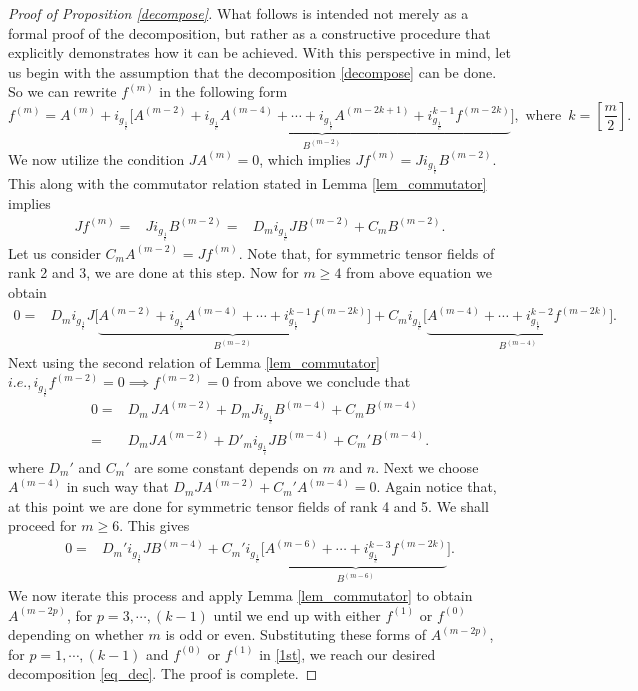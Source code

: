 \documentclass[11pt,a4paper,reqno]{amsart}
\newcommand{\gc}{i_{g_{\frac{1}{c}}}}
\begin{document}
		\begin{proof} [Proof of Proposition \ref{decompose}]
			What follows is intended not merely as a formal proof of the decomposition, but rather as a constructive procedure that explicitly demonstrates how it can be achieved. With this perspective in mind, let us begin with
			the assumption that the decomposition \eqref{decompose} can be done. So we can rewrite $f^{(m)}$ in the following form
			\[ \label{1st}
			f^{(m)}=A^{(m)}+i_{g_{\frac{1}{c}}}\Big[\underbrace{ A^{(m-2)}+i_{g_{\frac{1}{c}}}A^{(m-4)}+\cdots+i_{g_{\frac{1}{c}}}A^{(m-2k+1)}+i_{g_{\frac{1}{c}}}^{k-1}f^{(m-2k)}}_{B^{(m-2)}}\Big], \text{ where }\, k=[\frac{m}{2}].
			\]
			We now utilize the condition $JA^{(m)}=0$, which implies $Jf^{(m)}=Ji_{g_{\frac{1}{c}}}B^{(m-2)}.$ This along with the commutator relation stated in Lemma \ref{lem_commutator} implies
			\[
			\begin{aligned}
				Jf^{(m)}=&Ji_{g_{\frac{1}{c}}}B^{(m-2)}
				=&D_{m}i_{g_{\frac{1}{c}}}JB^{(m-2)}+C_mB^{(m-2)}.
			\end{aligned}
			\]
	Let us consider $C_mA^{(m-2)}=Jf^{(m)}$. Note that, for symmetric tensor fields of rank 2 and 3, we are done at this step. Now for $m\geq 4$  from above equation we obtain 
			\[
			\begin{aligned}
				0=&D_mi_{g_{\frac{1}{c}}}J\Big[\underbrace{ A^{(m-2)}+i_{g_{\frac{1}{c}}}A^{(m-4)}+\cdots+i_{g_{\frac{1}{c}}}^{k-1}f^{(m-2k)}}_{B^{(m-2)}}\Big]+C_{m}i_{g_{\frac{1}{c}}}\Big[\underbrace{ A^{(m-4)}+\cdots+i_{g_{\frac{1}{c}}}^{k-2}f^{(m-2k)}}_{B^{(m-4)}}\Big].
			\end{aligned}
			\]
			Next using  the second relation of Lemma \ref{lem_commutator} $i.e., \gc f^{(m-2)}=0 \implies  f^{(m-2)}=0$ from above we conclude that 
			\begin{align*}
				0 =& D_m\,JA^{(m-2)}+D_mJi_{g_{\frac{1}{c}}}{B^{(m-4)}}+C_mB^{(m-4)}\\
					=&D_mJA^{(m-2)}+D'_{m}i_{g_{\frac{1}{c}}}JB^{(m-4)}+ C_m' B^{(m-4)}.
			\end{align*} 
			where $D_m'$ and $C_m'$ are some constant depends on $m$ and $n$. Next we choose  $A^{(m-4)}$ in such way that  $D_m JA^{(m-2)}+C_m' A^{(m-4)}=0$. Again notice that, at this point we are done for symmetric tensor fields of rank 4 and 5. We shall proceed for $m\geq6$. This gives
			\[
			\begin{aligned}
				0=&D_m'i_{g_{\frac{1}{c}}}J B^{(m-4)}+C_m' i_{g_{\frac{1}{c}}}\Big[ \underbrace{A^{(m-6)}+\cdots +i_{g_{\frac{1}{c}}}^{k-3}f^{(m-2k)}}_{B^{(m-6)}}\Big].
			\end{aligned}
			\]
			We now iterate this process and apply Lemma \ref{lem_commutator} to obtain   $A^{(m-2p)}$, for $p=3,\cdots,(k-1)$ until we end up with either $f^{(1)}$ or $f^{(0)}$ depending on whether $m$ is odd or even. Substituting these forms of $A^{(m-2p)}$, for $p=1,\cdots,(k-1)$ and $f^{(0)}$ or $f^{(1)}$ in \eqref{1st}, we reach our desired decomposition \eqref{eq_dec}. The proof is complete.
		\end{proof}
\end{document}
